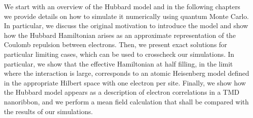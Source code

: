 
\label{cap:chapter}

We start with an overview of the Hubbard model and in the following chapters we provide details on how to simulate it numerically using quantum Monte Carlo. In particular, we discuss the original motivation to introduce the model and show how the Hubbard Hamiltonian arises as an approximate representation of the Coulomb repulsion between electrons. Then, we present exact solutions for particular limiting cases, which can be used to crosscheck our simulations. In particular, we show that the effective Hamiltonian at half filling, in the limit where the interaction is large, corresponds to an atomic Heisenberg model defined in the appropriate Hilbert space with one electron per site. Finally, we show how the Hubbard model appears as a description of electron correlations in a TMD nanoribbon, and we perform a mean field calculation that shall be compared with the results of our simulations.

%
%
%
%

\cleardoublepage
